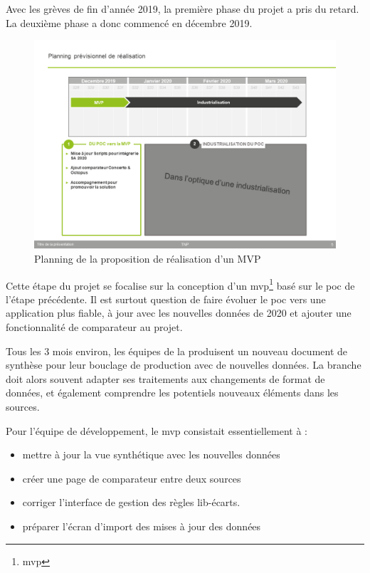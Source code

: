 Avec les grèves de fin d'année 2019, la première phase du projet a pris du retard. La deuxième phase a donc commencé en décembre 2019.

\begin{figure}[H]
    \centering
    \includegraphics[width=1\linewidth]{img/planning-decembre-mars-2020-MVP.png}
    \caption{Planning de la proposition de réalisation d’un MVP}
\end{figure}

Cette étape du projet se focalise sur la conception d'un 
\gls{mvp}\footnote{\glsdesc{mvp}}
basé sur le \gls{poc} de l'étape précédente. Il est surtout question de faire évoluer le \gls{poc} vers une application plus fiable, à jour avec les nouvelles données de 2020 et ajouter une fonctionnalité de comparateur au projet.

Tous les 3 mois environ, les équipes de la \sncf produisent un nouveau document de synthèse pour leur bouclage de production avec de nouvelles données. La branche \ds doit alors souvent adapter ses traitements aux changements de format de données, et également comprendre les potentiels nouveaux éléments dans les sources.

Pour l'équipe de développement, le \gls{mvp} consistait essentiellement à :

\begin{itemize}
    \item mettre à jour la vue synthétique avec les nouvelles données
    \item créer une page de comparateur entre deux sources
    \item corriger l'interface de gestion des règles lib-écarts.
    \item préparer l'écran d'import des mises à jour des données
\end{itemize}

